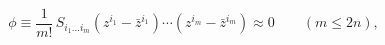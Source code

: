 \begin{equation}
\phi \equiv \frac{1}{m!}\,S_{i_{1}\ldots i_{m}}\left( z^{i_{1}}-\bar{z}%
^{i_{1}}\right) \cdots \left( z^{i_{m}}-\bar{z}^{i_{m}}\right) \approx
0\qquad \left( m\leq 2n\right) ,
\end{equation}

